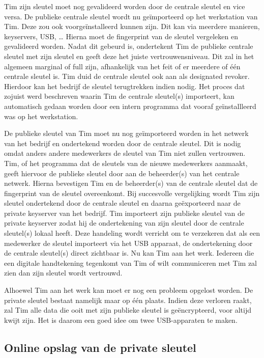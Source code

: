 Tim zijn sleutel moet nog gevalideerd worden door de centrale sleutel en vice
versa. De publieke centrale sleutel wordt nu geïmporteerd op het werkstation van
Tim. Deze zou ook voorgeïnstalleerd kunnen zijn. Dit kan via meerdere manieren,
keyservers, USB, … Hierna moet de fingerprint van de sleutel vergeleken en
gevalideerd worden. Nadat dit gebeurd is, ondertekent Tim de publieke centrale
sleutel met zijn sleutel en geeft deze het juiste vertrouwensniveau. Dit zal in
het algemeen marginal of full zijn, afhankelijk van het feit of er meerdere of
één centrale sleutel is. Tim duid de centrale sleutel ook aan als designated
revoker. Hierdoor kan het bedrijf de sleutel terugtrekken indien nodig. Het
proces dat zojuist werd beschreven waarin Tim de centrale sleutel(s) importeert,
kan automatisch gedaan worden door een intern programma dat vooraf
geïnstallleerd was op het werkstation.

De publieke sleutel van Tim moet nu nog geïmporteerd worden in het netwerk van
het bedrijf en ondertekend worden door de centrale sleutel. Dit is nodig omdat
anders andere medewerkers de sleutel van Tim niet zullen vertrouwen. Tim, of het
programma dat de sleutels van de nieuwe medewerkers aanmaakt, geeft hiervoor de
publieke sleutel door aan de beheerder(s) van het centrale netwerk. Hierna
bevestigen Tim en de beheerder(s) van de centrale sleutel dat de fingerprint van
de sleutel overeenkomt. Bij succesvolle vergelijking wordt Tim zijn sleutel
ondertekend door de centrale sleutel en daarna geëxporteerd naar de private
keyserver van het bedrijf. Tim importeert zijn publieke sleutel van de private
keyserver zodat hij de ondertekening van zijn sleutel door de centrale
sleutel(s) lokaal heeft. Deze handeling wordt verricht om te verzekeren dat als
een medewerker de sleutel importeert via het USB apparaat, de ondertekening door
de centrale sleutel(s) direct zichtbaar is. Nu kan Tim aan het werk. Iedereen
die een digitale
handtekening tegenkomt van Tim of wilt communiceren met Tim zal zien dan zijn
sleutel wordt vertrouwd.

Alhoewel Tim aan het werk kan moet er nog een probleem opgelost worden. De
private sleutel bestaat namelijk maar op één plaats. Indien deze verloren raakt,
zal Tim alle data die ooit met zijn publieke sleutel is geëncrypteerd, voor
altijd kwijt zijn. Het is daarom een goed idee om twee USB-apparaten te maken.

\subsection{Online opslag van de private sleutel}
\label{subsec:online-opslag-van-de-private-sleutel}

